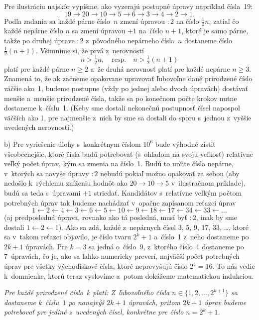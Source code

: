 {%
Pre ilustráciu najskôr vypíšme, ako vyzerajú postupné úpravy napríklad
čísla~19:
$$
19\to20\to10\to5\to6\to3\to4\to2\to1.
$$
Podľa zadania sa každé párne číslo~$n$ zmení úpravou $\boxed{:2}$
na číslo $\frac12n$, zatiaľ čo každé nepárne číslo $n$ sa zmení úpravou
$\boxed{+1}$ na~číslo $n+1$, ktoré je samo párne, takže po druhej úprave
$\boxed{:2}$ z~pôvodného nepárneho čísla~$n$
dostaneme číslo $\frac12(n+1)$. Všimnime si, že prvá
z~nerovností
$$
n>\tfrac12n,\quad \text{resp.}\quad n>\tfrac12(n+1)
$$
platí pre každé párne $n\ge2$ a~že druhá nerovnosť platí pre
každé nepárne $n\ge3$. Znamená to, že ak začneme opakovane upravovať
ľubovoľne dané prirodzené číslo väčšie ako~1, budeme postupne (vždy
po jednej alebo dvoch úpravách) dostávať menšie a~menšie prirodzené
čísla, takže sa po konečnom počte krokov nutne dostaneme k~číslu~1.
(Keby sme dostali nekonečnú postupnosť čísel napospol väčších
ako 1, pre najmenšie z~nich by sme sa dostali do sporu s~jednou
z~vyššie uvedených nerovností.)

\smallskip
b)
Pre vyriešenie úlohy s~konkrétnym číslom $10^{6}$ bude výhodné
zistiť všeobecnejšie, ktoré čísla budú potrebovať (s~ohľadom na svoju
veľkosť) relatívne veľký počet úprav, kým sa zmenia na číslo~1.
Budú to určite čísla nepárne, v~ktorých sa navyše úpravy $\boxed{:2}$
nebudú pokiaľ možno opakovať za sebou (aby nedošlo k~rýchlemu
zníženiu hodnôt ako $20\to10\to5$ v~ilustračnom príklade),
budú sa teda s~úpravami $\boxed{+1}$ striedať.
Kandidátov s~relatívne veľkým počtom
potrebných úprav tak budeme nachádzať v~opačne zapísanom reťazci
úprav
$$
1\gets2\gets4\gets3\gets6\gets5\gets10\gets9\gets18\gets17\gets34
\gets33\gets\dots
$$
(aj predposledná úprava, rovnako ako tá posledná, musí byť
$\boxed{:2}$, inak by sme dostali $1\gets2\gets1$). Ako sa zdá,
každé z~nepárnych čísel 3, 5, 9, 17, 33, \dots, ktoré sa v~takom reťazci
objavilo, je číslo tvaru $2^k+1$ a~číslo~1 z~neho dostaneme
po $2k+1$ úpravách. Pre $k=3$ sa jedná o~číslo~$9$, z~ktorého
číslo~1 dostaneme po 7~úpravách, čo je, ako sa ľahko
numericky preverí, najväčší počet potrebných úprav pre všetky
východiskové čísla, ktoré neprevyšujú číslo $2^4=16$.
To nás vedie k~domnienke, ktorú teraz vyslovíme
a~potom dokážeme matematickou indukciou.

{\sl Pre každé prirodzené číslo~$k$ platí:
Z~ľubovoľného čísla $n\in\{1,2,\dots,2^{k+1}\}$ sa dostaneme
k~číslu~$1$ po nanajvýš $2k+1$ úpravách, pritom $2k+1$ úprav
budeme potrebovať pre jediné z~uvedených čísel, konkrétne pre číslo $n=2^k+1$.}

}
